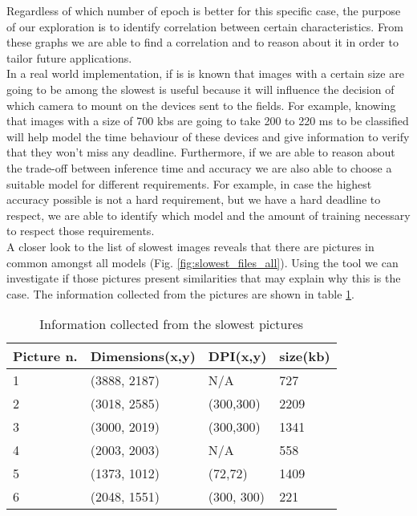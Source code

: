 Regardless of which number of epoch is better for this specific case, the purpose of our exploration is to identify correlation between certain characteristics. From these graphs we are able to find a correlation and to reason about it in order to tailor future applications. \\
In a real world implementation, if is is known that images with a certain size are going to be among the slowest is useful because it will influence the decision of which camera to mount on the devices sent to the fields. For example, knowing that images with a size of 700 kbs are going to take 200 to 220 ms to be classified will help model the time behaviour of these devices and give information to verify that they won't miss any deadline. Furthermore, if we are able to reason about the trade-off between inference time and accuracy we are also able to choose a suitable model for different requirements. For example, in case the highest accuracy possible is not a hard requirement, but we have a hard deadline to respect, we are able to identify which model and the amount of training necessary to respect those requirements. \\

A closer look to the list of slowest images reveals that there are pictures in common amongst all models (Fig. \ref{fig:slowest_files_all}). Using the tool we can investigate if those pictures present similarities that may explain why this is the case. The information collected from the pictures are shown in table 
\ref{tab:pictures_info}.

\begin{table}[htbp]
\centering
\begin{tabular}{ p{2cm} p{4cm}  p{2cm}  p{2cm}  }
 Picture n.& Dimensions(x,y) & DPI(x,y)&size(kb) \\
 \hline
1&(3888, 2187)&N/A& 727\\
2&(3018, 2585)&(300,300)&2209\\
3&(3000, 2019)&(300,300)&1341\\
4&(2003, 2003)&N/A&558\\
5&(1373, 1012)&(72,72)&1409\\
6&(2048, 1551)&(300, 300)&221\\
 \hline
\end{tabular}
\caption{Information collected from the slowest pictures}
\label{tab:pictures_info}
\end{table}


